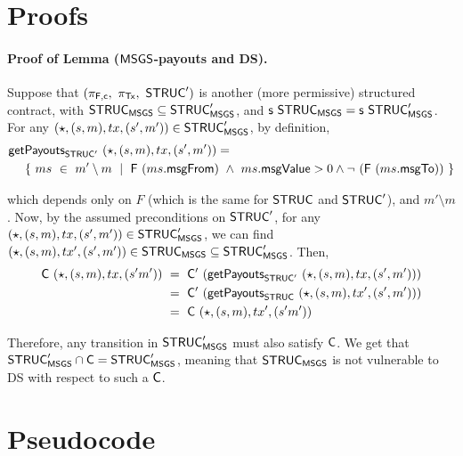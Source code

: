 \section{Proofs}
\label{sec:appendix-proofs}

\paragraph{Proof of Lemma ($\mathsf{MSGS}$-payouts and DS). }
Suppose that $(\pi_{\mathsf{F,c}},~\pi_{\mathsf{Tx}},~\mathsf{STRUC}')$ is another (more permissive) structured contract,
with $\mathsf{STRUC}_{\mathsf{MSGS}} \subseteq \mathsf{STRUC}'_{\mathsf{MSGS}}$, and $\mathsf{s}~\mathsf{STRUC}_{\mathsf{MSGS}} = \mathsf{s}~\mathsf{STRUC}'_{\mathsf{MSGS}}$.
For any $(\star, (s, m), tx, (s', m')) \in \mathsf{STRUC}'_{\mathsf{MSGS}}$, by definition,
\begin{align*}
  &\mathsf{getPayouts}_{\mathsf{STRUC}'}~(\star, (s, m), tx, (s', m')) = \\
  &~~~~ \{~ms~\in~m' \setminus m~\mid~\mathsf{F}~(ms.\mathsf{msgFrom}) ~\wedge~ms.\mathsf{msgValue} > 0 \wedge
  \neg~(\mathsf{F}~(ms.\mathsf{msgTo}))~\}
\end{align*}

which depends only on $F$ (which is the same for $\mathsf{STRUC}$ and $\mathsf{STRUC}'$), and $m' \setminus m$.
Now, by the assumed preconditions on $\mathsf{STRUC}'$, for any $(\star, (s, m), tx, (s', m')) \in \mathsf{STRUC}'_{\mathsf{MSGS}}$,
we can find $(\star, (s, m), tx', (s', m')) \in \mathsf{STRUC}_{\mathsf{MSGS}} \subseteq \mathsf{STRUC}'_{\mathsf{MSGS}}$.
Then,
\begin{align*}
  \mathsf{C}~(\star, (s, m), tx, (s' m'))~&=~\mathsf{C'}~(\mathsf{getPayouts}_{\mathsf{STRUC}'}~(\star, (s, m), tx, (s', m'))) \\
  &=~\mathsf{C'}~(\mathsf{getPayouts}_{\mathsf{STRUC}}~(\star, (s, m), tx', (s', m'))) \\
  &=~\mathsf{C}~(\star, (s, m), tx', (s' m'))
\end{align*}

Therefore, any transition in $\mathsf{STRUC}'_{\mathsf{MSGS}}$ must also satisfy $\mathsf{C}$.
We get that $\mathsf{STRUC}'_{\mathsf{MSGS}} \cap \mathsf{C} = \mathsf{STRUC}'_{\mathsf{MSGS}}$, meaning
that $\mathsf{STRUC}_{\mathsf{MSGS}}$ is not vulnerable to DS with respect to such a $\mathsf{C}$.

\section{Pseudocode}
\label{sec:appendix-pseudocode}

